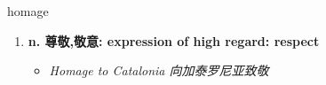 
\begin{frame}
{\huge homage}
\begin{center}
\begin{enumerate}\Large
  \item \textbf{n. 尊敬,敬意: expression of high regard: respect}
  \begin{itemize}
    \item \em{\Large{Homage to Catalonia 向加泰罗尼亚致敬}}
  \end{itemize}
\end{enumerate}
\end{center}
\end{frame}
